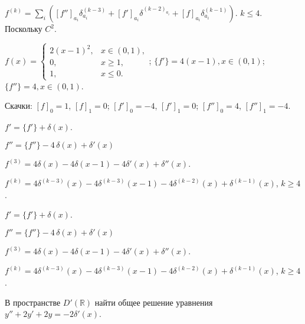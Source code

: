 \begin{sol}
	$f^{(k)}=\sum_i([f'']_{a_i}\delta^{(k-3)}_{a_i}+[f']_{a_i}\delta^{(k-2)_{a_i}}+[f]_{a_i}\delta^{(k-1)}_{a_i})$.
	$k\leq4$.
	Поскольку $C^2$.

	$
		f(x) =
		\begin{cases}
			2(x-1)^2, & x \in (0,1), \\
			0,        & x \ge 1,     \\
			1,        & x \le 0.
		\end{cases}
	$;
	$
		\{f'\}=4(x-1), x \in (0,1)
	$;
	$
		\{f''\}=4, x \in (0,1)
	$.

	Скачки:
	$[f]_0=1$, $[f]_1=0$; $[f']_0=-4$, $[f']_1=0$; $[f'']_0=4$, $[f'']_1=-4$.

	$f'=\{f'\}+\delta(x)$.

	$f''=\{f''\}-4\,\delta(x)+\delta'(x)$

	$f^{(3)}=4\delta(x)-4\delta(x-1)-4\delta'(x)+\delta''(x).$

	$f^{(k)}=4\delta^{(k-3)}(x)-4\delta^{(k-3)}(x-1)-4\delta^{(k-2)}(x)+\delta^{(k-1)}(x)$,
	$k\ge4$.


\end{sol}

\begin{out}

	$f'=\{f'\}+\delta(x)$.

	$f''=\{f''\}-4\,\delta(x)+\delta'(x)$

	$f^{(3)}=4\delta(x)-4\delta(x-1)-4\delta'(x)+\delta''(x).$

	$f^{(k)}=4\delta^{(k-3)}(x)-4\delta^{(k-3)}(x-1)-4\delta^{(k-2)}(x)+\delta^{(k-1)}(x)$,
	$k\ge4$.
\end{out}

\newpage
{}
\begin{cond}
	В пространстве \(D'(\mathbb{R})\) найти общее решение уравнения
	$y'' + 2y' + 2y = -2\delta'(x)$.
\end{cond}

